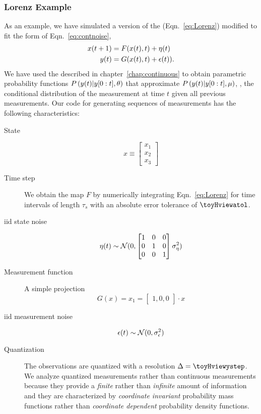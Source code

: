 \subsubsection{Lorenz Example}

As an example, we have simulated a version of the %
 (Eqn.~\eqref{eq:Lorenz}) modified to fit the
form of Eqn.~\eqref{eq:contnoise},
\begin{align*}
  {x}{(t+1)} &= F({x}{(t)},t) + {\eta}{(t)}\\
  {y}{(t)}   &= G({x}{(t)},t) + {\epsilon}{(t)}).
\end{align*}
We have used the  described in
chapter~\ref{chap:continuous} to obtain parametric probability
functions $P\left({y}{(t)}|y[0:t] , \theta \right)$ that
approximate $P\left({y}{(t)}|y[0:t], \mu \right)$, \ie, the
conditional distribution of the measurement at time $t$ given all
previous measurements.  Our code for generating sequences of
measurements has the following characteristics:
  \begin{description}
  \item[State] 
    \begin{equation*}
      x \equiv 
      \begin{bmatrix}
        x_1\\x_2\\x_3
      \end{bmatrix}
    \end{equation*}
  \item[Time step] We obtain the map $F$ by numerically integrating
    Eqn.~\eqref{eq:Lorenz} for time intervals of length $\tau_s$ with an
    absolute error tolerance of $\toyHviewatol$.
  \item[iid state noise] 
    \begin{equation*}
      {\eta}{(t)} \sim {\mathcal{N}}(0, \begin{bmatrix} 1 & 0 & 0\\0 & 1 &
        0\\0&0&1 \end{bmatrix} \sigma_\eta^2)
    \end{equation*}
  \item[Measurement function] A simple projection
    \begin{equation*}
      G(x) = x_1 = \begin{bmatrix} 1,0,0 \end{bmatrix} \cdot x
    \end{equation*}
  \item[iid measurement noise] 
    \begin{equation*}
      {\epsilon}{(t)} \sim {\mathcal{N}}(0, \sigma_\epsilon^2)
    \end{equation*}
  \item[Quantization] The observations are quantized with a resolution
    $\Delta=\toyHviewystep$.  We analyze quantized measurements rather than
    continuous measurements because they provide a \emph{finite} rather
    than \emph{infinite} amount of information and they are
    characterized by \emph{coordinate invariant} probability mass
    functions rather than \emph{coordinate dependent} probability
    density functions.
\end{description}
